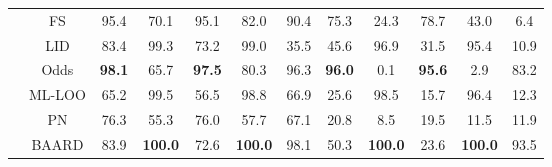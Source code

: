 \documentclass[varwidth=\maxdimen]{standalone}
\begin{document}
\begin{table}
\begin{tabular}{c|c|ccccc|ccccc}
                                                   & FS                                                    & 95.4                             & 70.1                              & 95.1                    & 82.0                        & 90.4                      & 75.3                    & 24.3             & 78.7              & 43.0             & {\color{red}6.4}  \\
                                                   & LID                                                   & 83.4                             & 99.3                              & 73.2                    & 99.0                        & {\color{red}35.5}         & 45.6                    & 96.9             & 31.5              & 95.4             & 10.9              \\
                                                   & Odds                                                  & \textbf{98.1}                    & 65.7                              & \textbf{97.5}           & 80.3                        & 96.3                      & \textbf{96.0}           & 0.1              & \textbf{95.6}     & 2.9              & 83.2              \\
                                                   & ML-LOO                                                & 65.2                             & 99.5                              & {\color{red}56.5}       & 98.8                        & 66.9                      & 25.6                    & 98.5             & 15.7              & 96.4             & 12.3              \\
                                                   & PN                                                    & 76.3                             & 55.3                              & 76.0                    & 57.7                        & 67.1                      & 20.8                    & 8.5              & 19.5              & 11.5             & 11.9              \\
                                                   & BAARD                                                 & 83.9                             & \textbf{100.0}                    & 72.6                    & \textbf{100.0}              & 98.1                      & 50.3                    & \textbf{100.0}   & 23.6              & \textbf{100.0}   & 93.5              \\


\end{tabular}
\end{table}
\end{document}
